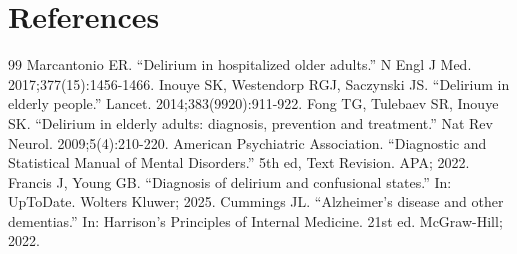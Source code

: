 \section*{References}
\begin{thebibliography}{99}
 Marcantonio ER. ``Delirium in hospitalized older adults.'' N Engl J Med. 2017;377(15):1456-1466.
 Inouye SK, Westendorp RGJ, Saczynski JS. ``Delirium in elderly people.'' Lancet. 2014;383(9920):911-922.
 Fong TG, Tulebaev SR, Inouye SK. ``Delirium in elderly adults: diagnosis, prevention and treatment.'' Nat Rev Neurol. 2009;5(4):210-220.
 American Psychiatric Association. ``Diagnostic and Statistical Manual of Mental Disorders.'' 5th ed, Text Revision. APA; 2022.
 Francis J, Young GB. ``Diagnosis of delirium and confusional states.'' In: UpToDate. Wolters Kluwer; 2025.
 Cummings JL. ``Alzheimer's disease and other dementias.'' In: Harrison's Principles of Internal Medicine. 21st ed. McGraw-Hill; 2022.
\end{thebibliography}
